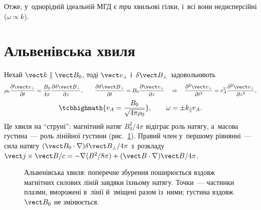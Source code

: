 Отже, у~однорідній ідеальній МГД є \emph{три} хвильові гілки, і~всі вони недисперсійні
($\omega\propto k$).



\section{Альвенівська хвиля}\label{sec:alfven-wave}



Нехай $\vect k\parallel\vect B_0$, тоді $\vect v_\perp$ і~$\delta\vect B_\perp$ задовольняють
\begin{equation}
\rho_0\frac{\partial\vect v_\perp}{\partial t}=\frac{B_0}{4\pi}\frac{\partial\delta\vect B_\perp}{\partial z},
\qquad
\frac{\partial\delta\vect B_\perp}{\partial t}=B_0\frac{\partial\vect v_\perp}{\partial z}
\quad\Rightarrow\quad
\frac{\partial^2\vect v_\perp}{\partial t^2}=v_A^2\frac{\partial^2\vect v_\perp}{\partial z^2},
\label{eq:wave-alfven-equation}
\end{equation}
\begin{equation}
\tcbhighmath{v_A=\frac{B_0}{\sqrt{4\pi\rho_0}}},\qquad
\omega=\pm k_\parallel v_A.
\label{eq:wave-alfven-speed}
\end{equation}
Це хвиля на \enquote{струні}: магнітний натяг $B_0^2/4\pi$ відіграє роль натягу, а~масова густина~---
роль лінійної густини (рис.~\ref{fig:alfven-wave}). Правий член у~першому рівнянні~---
сила натягу $(\vect B_0\cdot\nabla)\delta\vect B_\perp/4\pi$ з~розкладу
$\vect j\times\vect B/c=-\nabla(B^2/8\pi)+(\vect B\cdot\nabla)\vect B/4\pi$.

\begin{figure}[ht]
\centering
{}
\caption{Альвенівська хвиля: поперечне збурення поширюється вздовж магнітних силових ліній
завдяки їхньому натягу. Точки~--- частинки плазми, вморожені в~лінії й~зміщені разом із~ними;
густина вздовж $\vect B_0$ не змінюється.}
\label{fig:alfven-wave}
\end{figure}

